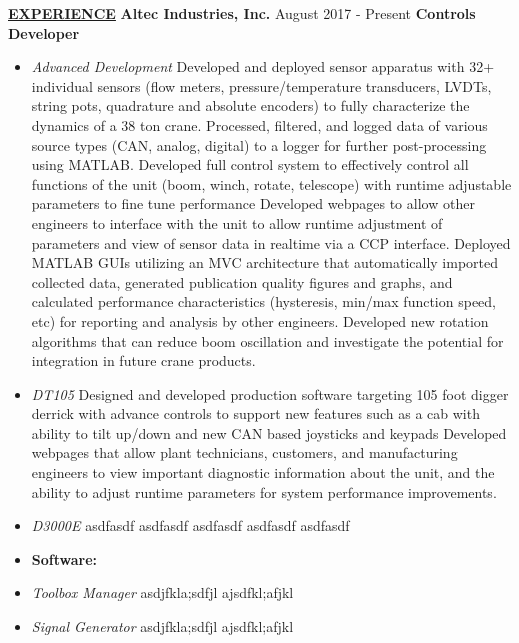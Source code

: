 \documentclass[8pt,letterpaper,oneside]{article}
\newcommand{\longunderline}[1]{\uline{#1\hfill\mbox{}}}
\newcommand{\sectionhead}[1]{ \large \flushleft \longunderline{\textbf{#1}}} %
\begin{document}
    \sectionhead{EXPERIENCE}
    \newline
    \normalsize{\textbf{Altec Industries, Inc.}}
    \hfill
    August 2017 - Present
    \newline
    \normalsize{\textbf{Controls Developer}}
    \begin{sectionitems}
        \begin{itemize}
            \setlength\itemsep{0.1em}
            \setlength{\itemindent}{-0.4em}
            \item \textit{Advanced Development}
            \subitem Developed and deployed sensor apparatus with 32+ individual sensors (flow meters, pressure/temperature transducers, LVDTs, string pots, quadrature and absolute encoders) to fully characterize the dynamics of a 38 ton crane.
            \subitem Processed, filtered, and logged data of various source types (CAN, analog, digital) to a logger for further post-processing using MATLAB.
            \subitem Developed full control system to effectively control all functions of the unit (boom, winch, rotate, telescope) with runtime adjustable parameters to fine tune performance
            \subitem Developed webpages to allow other engineers to interface with the unit to allow runtime adjustment of parameters and view of sensor data in realtime via a CCP interface.
            \subitem Deployed MATLAB GUIs utilizing an MVC architecture that automatically imported collected data, generated publication quality figures and graphs, and calculated performance characteristics (hysteresis, min/max function speed, etc) for reporting and analysis by other engineers.
            \subitem Developed new rotation algorithms that can reduce boom oscillation and investigate the potential for integration in future crane products.
            \item \textit{DT105}
            \subitem Designed and developed production software targeting 105 foot digger derrick with advance controls to support new features such as a cab with ability to tilt up/down and new CAN based joysticks and keypads
            \subitem Developed webpages that allow plant technicians, customers, and manufacturing engineers to view important diagnostic information about the unit, and the ability to adjust runtime parameters for system performance improvements.
            \item \textit{D3000E}
            \subitem asdfasdf
            \subitem asdfasdf
            \subitem asdfasdf
            \subitem asdfasdf
            \subitem asdfasdf
            \item \textbf{Software:}
            \item \textit{Toolbox Manager}
            \subitem  asdjfkla;sdfjl
            \subitem ajsdfkl;afjkl
            \item \textit{Signal Generator}
            \subitem asdjfkla;sdfjl
            \subitem ajsdfkl;afjkl
        \end{itemize}
    \end{sectionitems}
\end{document}
